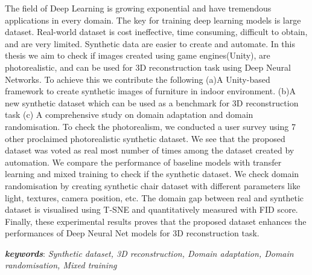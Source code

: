 \documentclass[
]{thesis}
\begin{document}
The field of Deep Learning is growing exponential and have tremendous applications in every domain.
The key for training deep learning models is large dataset.
Real-world dataset is cost ineffective, time consuming, difficult to obtain, and are very limited.
Synthetic data are easier to create and automate.
In this thesis we aim to check if images created using game engines(Unity), are photorealistic, and can be used for 3D reconstruction task using Deep Neural Networks.
To achieve this we contribute the following (a)A Unity-based framework to create synthetic images of furniture in indoor environment.
(b)A new synthetic dataset which can be used as a benchmark for 3D reconstruction task (c) A comprehensive study on domain adaptation and domain randomisation.
To check the photorealism, we conducted a user survey using 7 other proclaimed photorealistic synthetic dataset.
We see that the proposed dataset was voted as real most number of times among the dataset created by automation.
We compare the performance of baseline models with transfer learning and mixed training to check if the synthetic dataset.
We check domain randomisation by creating synthetic chair dataset with different parameters like light, textures, camera position, etc.
The domain gap between real and synthetic dataset is visualised using T-SNE and quantitatively measured with FID score.
Finally, these experimental results proves that the proposed dataset enhances the performances of Deep Neural Net models for 3D reconstruction task.

\textbf{ \emph{keywords}}: \emph{Synthetic dataset, 3D reconstruction, Domain adaptation, Domain randomisation, Mixed training}


\blankpage

\iftoggle{german}{\chapter*{Danksagungen}}{\chapter*{Acknowledgments}}
\end{document}
